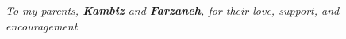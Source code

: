 \begin{center}
    {\thispagestyle{empty}
    \itshape
    \vspace*{\fill}
    To my parents, \textbf{Kambiz} and \textbf{Farzaneh}, for their love, support, and encouragement
    \vspace*{\fill}
    }
\end{center}

